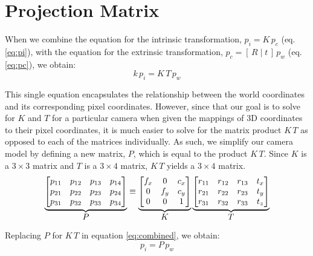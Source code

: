 \section{Projection Matrix} \label{sec:projection}

When we combine the equation for the intrinsic transformation, $p_i = K\,p_c$ (eq. \ref{eq:pi}), with the equation for the extrinsic transformation, $p_c = [\,R\;|\;t\,]\,p_w$ (eq. \ref{eq:pc}), we obtain:
\begin{equation} \label{eq:combined}
    k\,p_{i} = K\,T\,p_{w}
\end{equation}

This single equation encapsulates the relationship between the world coordinates and its corresponding pixel coordinates. However, since that our goal is to solve for $K$ and $T$ for a particular camera when given the mappings of 3D coordinates to their pixel coordinates, it is much easier to solve for the matrix product $K\,T$ as opposed to each of the matrices individually. As such, we simplify our camera model by defining a new matrix, $P$, which is equal to the product $K\,T$. Since $K$ is a $3 \times 3$ matrix and $T$ is a $3 \times 4$ matrix, $K\,T$ yields a $3 \times 4$ matrix. 
\begin{equation}
    \underbrace{
        \begin{bmatrix}
        p_{11} & p_{12} & p_{13} & p_{14} \\
        p_{21} & p_{22} & p_{23} & p_{24} \\
        p_{31} & p_{32} & p_{33} & p_{34}
    \end{bmatrix}
    }_{\mathlarger{P}}
    \equiv
    \underbrace{
        \begin{bmatrix}
            f_x & 0   & c_x \\
            0   & f_y & c_y \\
            0   & 0   & 1
        \end{bmatrix}
    }_{\mathlarger{K}}
    \underbrace{
        \begin{bmatrix}
            r_{11} & r_{12} & r_{13} & t_x \\
            r_{21} & r_{22} & r_{23} & t_y \\
            r_{31} & r_{32} & r_{33} & t_z \\
        \end{bmatrix}
    }_{\mathlarger{T}}
\end{equation}

Replacing $P$ for $K\,T$ in equation \ref{eq:combined}, we obtain:
\begin{equation} \label{eq:project}
    p_{i} = P\,p_{w}
\end{equation}

